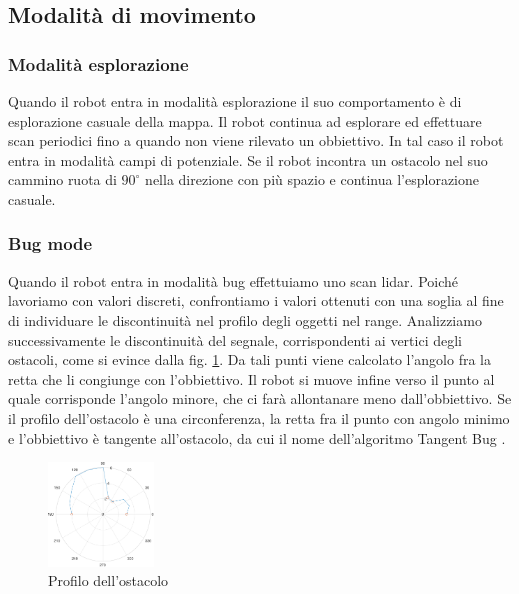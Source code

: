 \documentclass[a4paper]{article}
\begin{document}
	\subsection{Modalità di movimento}\label{subsec:Modalità-di-movimento}
	
	\subsubsection{Modalità esplorazione}\label{subsec:Modalita-esplorazione}
	Quando il robot entra in modalità esplorazione il suo comportamento è di
	esplorazione casuale della mappa. Il robot continua ad esplorare ed
	effettuare scan periodici fino a quando non viene rilevato un obbiettivo.
	In tal caso il robot entra in modalità campi di potenziale. Se il robot
	incontra un ostacolo nel suo cammino ruota di $90^{\circ}$ nella direzione
	con più spazio e continua l'esplorazione casuale.
	
	\subsubsection{Bug mode}\label{subsec:Bug-mode}
	Quando il robot entra in modalità bug effettuiamo uno scan lidar. Poiché
	lavoriamo con valori discreti, confrontiamo i valori ottenuti con una
	soglia al fine di individuare le discontinuità nel profilo degli oggetti
	nel range. Analizziamo successivamente le discontinuità del segnale,
	corrispondenti ai vertici degli ostacoli, come si evince dalla fig.
	\ref{fig:bug}. Da tali punti viene calcolato l'angolo fra la retta che li
	congiunge con l'obbiettivo. Il robot si muove infine verso il punto al
	quale corrisponde l'angolo minore, che ci farà allontanare meno
	dall'obbiettivo. Se il profilo dell'ostacolo è una circonferenza, la retta
	fra il punto con angolo minimo e l'obbiettivo è tangente all'ostacolo, da
	cui il nome dell'algoritmo Tangent Bug \cite{503814}.
	
	\begin{figure}[H]
		\centering
		\includegraphics[width=0.25\textwidth]{./img/bug.pdf}
		\caption{Profilo dell'ostacolo}
		\label{fig:bug}
	\end{figure}
\end{document}
